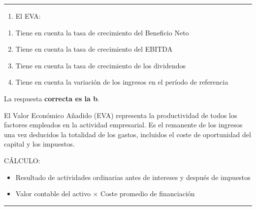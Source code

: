 \documentclass[
  letterpaper,
  DIV=11,
  numbers=noendperiod]{scrreprt}
\providecommand{\tightlist}{%
  \setlength{\itemsep}{0pt}\setlength{\parskip}{0pt}}\usepackage{longtable,booktabs,array}
\begin{document}
\begin{center}\rule{0.5\linewidth}{0.5pt}\end{center}

\begin{enumerate}
\def\labelenumi{\arabic{enumi}.}
\setcounter{enumi}{89}
\tightlist
\item
  El EVA:
\end{enumerate}

\begin{enumerate}
\def\labelenumi{\alph{enumi})}
\item
  Tiene en cuenta la tasa de crecimiento del Beneficio Neto
\item
  Tiene en cuenta la tasa de crecimiento del EBITDA
\item
  Tiene en cuenta la tasa de crecimiento de los dividendos
\item
  Tiene en cuenta la variación de los ingresos en el período de
  referencia
\end{enumerate}

\begin{tcolorbox}[enhanced jigsaw, left=2mm, opacityback=0, colback=white, breakable, arc=.35mm, bottomrule=.15mm, rightrule=.15mm, toprule=.15mm, leftrule=.75mm, colframe=quarto-callout-tip-color-frame]
\begin{minipage}[t]{5.5mm}
\textcolor{quarto-callout-tip-color}{\faLightbulb}
\end{minipage}%
\begin{minipage}[t]{\textwidth - 5.5mm}

La respuesta \textbf{correcta es la b}.

El Valor Económico Añadido (EVA) representa la productividad de todos
los factores empleados en la actividad empresarial. Es el remanente de
los ingresos una vez deducidos la totalidad de los gastos, incluidos el
coste de oportunidad del capital y los impuestos.

CÁLCULO:

\begin{itemize}
\item
  Resultado de actividades ordinarias antes de intereses y después de
  impuestos
\item
  Valor contable del activo × Coste promedio de financiación
\end{itemize}

\end{minipage}%
\end{tcolorbox}

\begin{center}\rule{0.5\linewidth}{0.5pt}\end{center}
\end{document}
